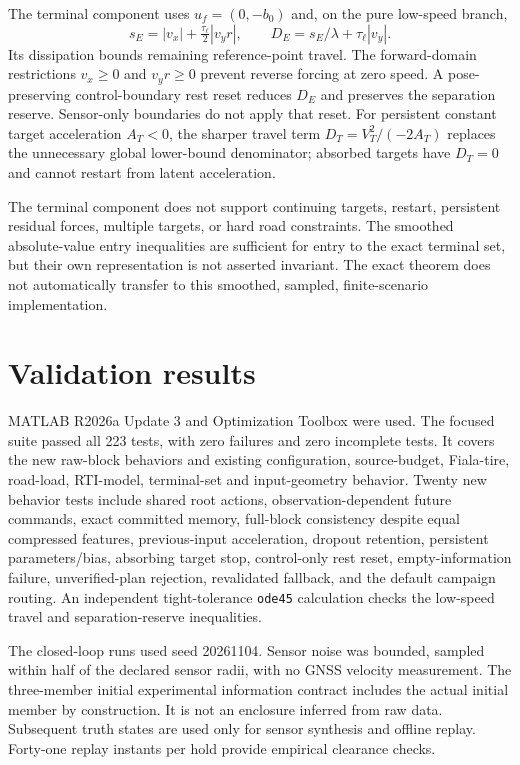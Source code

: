 \documentclass[11pt]{article}
\begin{document}
The terminal component uses $u_f=(0,-b_0)$ and, on the pure low-speed branch,
\[
 s_E=|v_x|+\tfrac{\tau_\ell}{2}|v_y r|,\qquad
 D_E=s_E/\lambda+\tau_\ell|v_y|.
\]
Its dissipation bounds remaining reference-point travel. The forward-domain
restrictions $v_x\ge0$ and $v_y r\ge0$ prevent reverse forcing at zero speed.
A pose-preserving control-boundary rest reset reduces $D_E$ and preserves the
separation reserve. Sensor-only boundaries do not apply that reset.
For persistent constant target acceleration $A_T<0$, the sharper travel term
$D_T=V_T^2/(-2A_T)$ replaces the unnecessary global lower-bound denominator;
absorbed targets have $D_T=0$ and cannot restart from latent acceleration.

The terminal component does not support continuing targets, restart,
persistent residual forces, multiple targets, or hard road constraints.
The smoothed absolute-value entry inequalities are sufficient for entry to the
exact terminal set, but their own representation is not asserted invariant.
The exact theorem does not automatically transfer to this smoothed, sampled,
finite-scenario implementation.

\section*{Validation results}
MATLAB R2026a Update 3 and Optimization Toolbox were used. The focused suite
passed all 223 tests, with zero failures and zero incomplete tests. It covers
the new raw-block behaviors and existing configuration, source-budget,
Fiala-tire, road-load, RTI-model, terminal-set and input-geometry behavior.
Twenty new behavior tests include shared root actions, observation-dependent
future commands, exact committed memory, full-block consistency despite equal
compressed features, previous-input acceleration, dropout retention, persistent
parameters/bias, absorbing target stop, control-only rest reset, empty-information
failure, unverified-plan rejection, revalidated fallback, and the default
campaign routing. An independent tight-tolerance \texttt{ode45} calculation
checks the low-speed travel and separation-reserve inequalities.

The closed-loop runs used seed 20261104. Sensor noise was bounded, sampled
within half of the declared sensor radii, with no GNSS velocity measurement.
The three-member initial experimental information contract includes the actual
initial member by construction. It is not an enclosure inferred from raw data.
Subsequent truth states are used only for sensor synthesis and offline replay.
Forty-one replay instants per hold provide empirical clearance checks.
\end{document}
